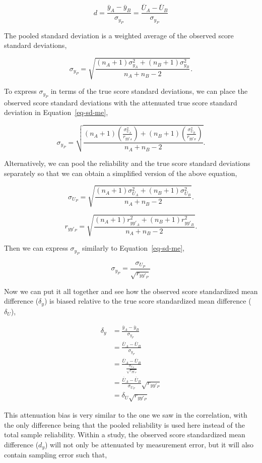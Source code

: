 \documentclass[
  letterpaper,
  DIV=11,
  numbers=noendperiod]{scrreprt}
\begin{document}
\[
d = \frac{\bar{y}_A-\bar{y}_B}{\sigma_{y_P}} = \frac{\overline{U}_A-\overline{U}_B}{\sigma_{y_P}}
\]

The pooled standard deviation is a weighted average of the observed
score standard deviations,

\[
\sigma_{y_P}=\sqrt{\frac{(n_A+1)\sigma^2_{y_A}+(n_B+1)\sigma^2_{y_B}}{n_A+n_B-2}}.
\]

To express \(\sigma_{y_P}\) in terms of the true score standard
deviations, we can place the observed score standard deviations with the
attenuated true score standard deviation in Equation~\ref{eq-sd-me},

\[
\sigma_{y_P} = \sqrt{\frac{(n_A+1)\left(\frac{\sigma^2_{U_A}}{r_{yy'_A}}\right)+(n_B+1)\left(\frac{\sigma^2_{U_B}}{r_{yy'_B}}\right)}{n_A + n_B - 2}}.
\]

Alternatively, we can pool the reliability and the true score standard
deviations separately so that we can obtain a simplified version of the
above equation,

\[
\sigma_{U_P} = \sqrt{\frac{(n_A+1)\sigma_{U_A}^2+(n_B+1)\sigma_{U_B}^2}{n_A + n_B - 2}}.
\]

\[
r_{yy'_P} = \sqrt{\frac{(n_A+1) r_{yy'_A}^2+(n_B+1)r_{yy'_B}^2}{n_A + n_B - 2}}.
\]

Then we can express \(\sigma_{y_P}\) similarly to
Equation~\ref{eq-sd-me},

\[
\sigma_{y_P} = \frac{\sigma_{U_P}}{\sqrt{r_{yy'_P}}}
\]

Now we can put it all together and see how the observed score
standardized mean difference (\(\delta_y\)) is biased relative to the
true score standardized mean difference (\(\delta_U\)),

\begin{align}
\delta_y &= \frac{\bar{y}_A-\bar{y}_B}{\sigma_{y_P}}
\\[1em] &= \frac{\overline{U}_A-\overline{U}_B}{\sigma_{y_P}}
\\[1em] &= \frac{\overline{U}_A-\overline{U}_B}{\frac{\sigma_{U_P}}{\sqrt{r_{yy'_P}}}} 
\\[1em] &= \frac{\overline{U}_A-\overline{U}_B}{\sigma_{U_P}}\sqrt{r_{yy'_P}}
\\[1em] &= \delta_U\sqrt{r_{yy'_P}}
\end{align}

This attenuation bias is very similar to the one we saw in the
correlation, with the only difference being that the pooled reliability
is used here instead of the total sample reliability. Within a study,
the observed score standardized mean difference (\(d_y\)) will not only
be attenuated by measurement error, but it will also contain sampling
error such that,
\end{document}

